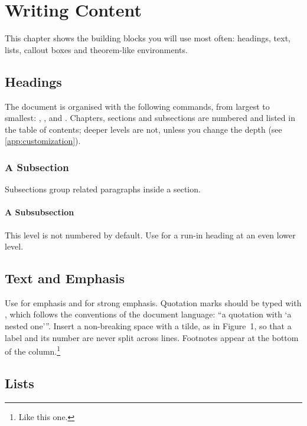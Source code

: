 \chapter{Writing Content}\label{chap:writing-content}

This chapter shows the building blocks you will use most often: headings,
text, lists, callout boxes and theorem-like environments.

\section{Headings}\label{sec:headings}

The document is organised with the following commands, from largest to
smallest: , ,  and
. Chapters, sections and subsections are numbered and
listed in the table of contents; deeper levels are not, unless you change the
depth (see \cref{app:customization}).

\subsection{A Subsection}

Subsections group related paragraphs inside a section.

\subsubsection{A Subsubsection}

This level is not numbered by default. Use  for a run-in
heading at an even lower level.

\section{Text and Emphasis}\label{sec:text}

Use  for emphasis and  for strong emphasis. Quotation
marks should be typed with , which follows the conventions of the
document language: \enquote{a quotation with \enquote{a nested one}}. Insert a
non-breaking space with a tilde, as in Figure~1, so that a label and its
number are never split across lines. Footnotes appear at the bottom of the
column.\footnote{Like this one.}

\section{Lists}\label{sec:lists}

